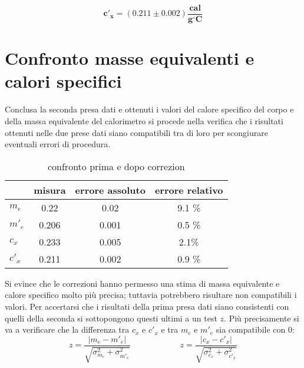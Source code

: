 \documentclass{article}
\begin{document}
	\[ 
	\boxed{\boldsymbol{c'_{x} = (0.211 \pm 0.002) \frac{\text{cal}}{g ^\circ C}}}
	\]
	
	\newpage
	\section{Confronto masse equivalenti e calori specifici}
	Conclusa la seconda presa dati e ottenuti i valori del calore specifico del corpo e della massa equivalente del calorimetro si procede nella verifica che i risultati ottenuti nelle due prese dati siano compatibili tra di loro per scongiurare eventuali errori di procedura.
	
	\begin{table}[H] \centering
		\begin{small}
			\begin{tabular}{@{}lccc@{}}
				&  	\textbf{misura}	& \textbf{errore assoluto} & \textbf{errore relativo}   \\ \bottomrule
				\(m_{e}\) & 0.22   & 0.02 & 9.1 \% \\ \hdashline
				\(m'_{e}\) &0.206 & 0.001 & 0.5 \% \\ \midrule
				\(c_{x}\) & 0.233 & 0.005& 2.1\%\\ \hdashline
				\(c'_{x}\) &0.211 & 0.002& 0.9 \%\\ \bottomrule
			\end{tabular}
			\caption{confronto prima e dopo correzion}
		\end{small}
	\end{table}
	
Si evince che le correzioni hanno permesso una stima di massa equivalente e calore specifico molto più precisa; tuttavia potrebbero risultare non compatibili i valori. Per accertarsi che i risultati della prima presa dati siano consistenti con quelli della seconda si sottopongono questi ultimi a un test \(z\). Più precisamente si va a verificare che la differenza tra \(c_{x}\) e \(c'_{x}\) e tra \(m_{e}\) e \(m'_{e}\) sia compatibile con \(0\):
\[ 
z = \frac{|m_e-m'_e|}{\sqrt{\sigma_{m_e}^2 + \sigma_{m'_e}^2}}  \qquad \qquad \qquad z = \frac{|c_{x}-c'_{x}|}{\sqrt{\sigma_{c_{x}}^2 + \sigma_{c'_{x}}^2}}
\]
\end{document}
